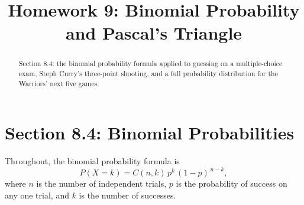 \documentclass[12pt]{ximera}
\title{Homework 9: Binomial Probability and Pascal's Triangle}
\begin{document}
\begin{abstract}
Section 8.4: the binomial probability formula applied to guessing on a multiple-choice
exam, Steph Curry's three-point shooting, and a full probability distribution for the
Warriors' next five games.
\end{abstract}
\maketitle

\section*{Section 8.4: Binomial Probabilities}

Throughout, the binomial probability formula is
\[
P(X=k) = C(n,k)\, p^k\, (1-p)^{\,n-k},
\]
where $n$ is the number of independent trials, $p$ is the probability of success on
any one trial, and $k$ is the number of successes.
\end{document}
